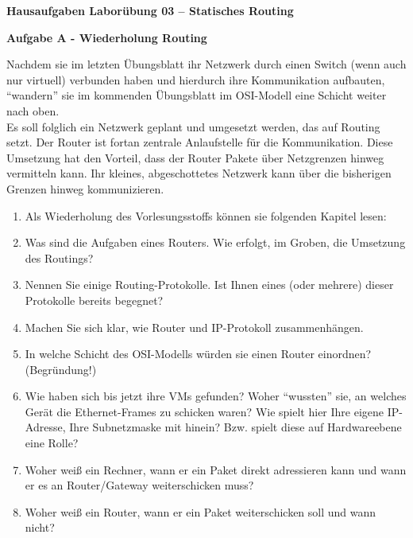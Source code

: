\documentclass[paper=a4,fontsize=11pt]{scrartcl}%
\numberwithin{equation}{section}
\begin{document}
\begin{center}
\Large{\textbf{Hausaufgaben Laborübung 03 -- Statisches Routing}}
\end{center}
\begin{center}\Large{\textbf{Aufgabe A - Wiederholung Routing}}
\end{center}\vskip0.25in
Nachdem sie im letzten Übungsblatt ihr Netzwerk durch einen Switch (wenn auch nur virtuell) verbunden haben und hierdurch ihre Kommunikation aufbauten, \enquote{wandern} sie im kommenden Übungsblatt im OSI-Modell eine Schicht weiter nach oben.\\
Es soll folglich ein Netzwerk geplant und umgesetzt werden, das auf Routing setzt. Der Router ist fortan zentrale Anlaufstelle für die Kommunikation. Diese Umsetzung hat den Vorteil, dass der Router Pakete über Netzgrenzen hinweg vermitteln kann. Ihr kleines, abgeschottetes Netzwerk kann über die bisherigen Grenzen hinweg kommunizieren.
\begin{enumerate}
	\item Als Wiederholung des Vorlesungsstoffs können sie folgenden Kapitel lesen: \cite[Kap. 4.1, 4.3]{Kurose2012}
	\item Was sind die Aufgaben eines Routers. Wie erfolgt, im Groben, die Umsetzung des Routings?
	\item Nennen Sie einige Routing-Protokolle. Ist Ihnen eines (oder mehrere) dieser Protokolle bereits begegnet?
	\item Machen Sie sich klar, wie Router und IP-Protokoll zusammenhängen.
	\item In welche Schicht des OSI-Modells würden sie einen Router einordnen? (Begründung!)
	\item Wie haben sich bis jetzt ihre VMs gefunden? Woher \enquote{wussten} sie, an welches Gerät die Ethernet-Frames zu schicken waren? Wie spielt hier Ihre eigene IP-Adresse, Ihre Subnetzmaske mit hinein? Bzw. spielt diese auf Hardwareebene eine Rolle?
	\item Woher weiß ein Rechner, wann er ein Paket direkt adressieren kann und wann er es an Router/Gateway weiterschicken muss?
	\item Woher weiß ein Router, wann er ein Paket weiterschicken soll und wann nicht?
\end{enumerate}
\end{document}
